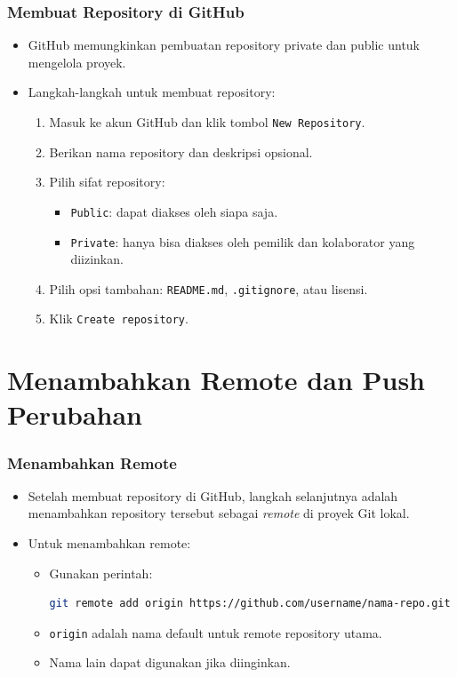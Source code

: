 \documentclass[aspectratio=169, table]{beamer}
\begin{document}
	\begin{frame}[fragile]
		\frametitle{Membuat Repository di GitHub}
		\begin{itemize}
			\item GitHub memungkinkan pembuatan repository private dan public untuk mengelola proyek.
			\item Langkah-langkah untuk membuat repository:
			\begin{enumerate}
				\item Masuk ke akun GitHub dan klik tombol \texttt{New Repository}.
				\item Berikan nama repository dan deskripsi opsional.
				\item Pilih sifat repository:
				\begin{itemize}
					\item \texttt{Public}: dapat diakses oleh siapa saja.
					\item \texttt{Private}: hanya bisa diakses oleh pemilik dan kolaborator yang diizinkan.
				\end{itemize}
				\item Pilih opsi tambahan: \texttt{README.md}, \texttt{.gitignore}, atau lisensi.
				\item Klik \texttt{Create repository}.
			\end{enumerate}
		\end{itemize}
	\end{frame}
	
	\section{Menambahkan Remote dan Push Perubahan}
	
	\begin{frame}[fragile]
		\frametitle{Menambahkan Remote}
		\begin{itemize}
			\item Setelah membuat repository di GitHub, langkah selanjutnya adalah menambahkan repository tersebut sebagai \textit{remote} di proyek Git lokal.
			\item Untuk menambahkan remote:
			\begin{itemize}
				\item Gunakan perintah:
				\begin{lstlisting}[language=bash]
					git remote add origin https://github.com/username/nama-repo.git
				\end{lstlisting}
				\item \texttt{origin} adalah nama default untuk remote repository utama.
				\item Nama lain dapat digunakan jika diinginkan.
			\end{itemize}
		\end{itemize}
	\end{frame}
	
\end{document}
